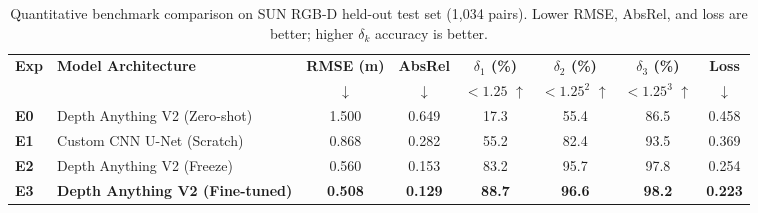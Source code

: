 \documentclass[twoside,final]{hcmut-report}
\renewcommand{\arraystretch}{1.12}
\begin{document}
\begin{table}[!htbp]

  \centering

  \caption{Quantitative benchmark comparison on SUN RGB-D held-out test set (1,034 pairs). Lower RMSE, AbsRel, and loss are better; higher $\delta_k$ accuracy is better.}

  \label{tab:benchmark_results}

  \small

  \setlength{\tabcolsep}{4pt}

  \renewcommand{\arraystretch}{1.12}

  \begin{adjustbox}{max width=\linewidth}
\begin{tabular}{@{}llcccccc@{}}

    \toprule

    \textbf{Exp}

    & \textbf{Model Architecture}

    & \textbf{RMSE (m)}

    & \textbf{AbsRel}

    & \textbf{$\delta_1$ (\%)}

    & \textbf{$\delta_2$ (\%)}

    & \textbf{$\delta_3$ (\%)}

    & \textbf{Loss} \\

    &

    & $\downarrow$

    & $\downarrow$

    & {\scriptsize $<1.25$ $\uparrow$}

    & {\scriptsize $<1.25^2$ $\uparrow$}

    & {\scriptsize $<1.25^3$ $\uparrow$}

    & $\downarrow$ \\

    \midrule

    \textbf{E0} & Depth Anything V2 (Zero-shot) & 1.500 & 0.649 & 17.3 & 55.4 & 86.5 & 0.458 \\

    \textbf{E1} & Custom CNN U-Net (Scratch)    & 0.868 & 0.282 & 55.2 & 82.4 & 93.5 & 0.369 \\

    \textbf{E2} & Depth Anything V2 (Freeze)    & 0.560 & 0.153 & 83.2 & 95.7 & 97.8 & 0.254 \\

    \textbf{E3} & \textbf{Depth Anything V2 (Fine-tuned)} & \textbf{0.508} & \textbf{0.129} & \textbf{88.7} & \textbf{96.6} & \textbf{98.2} & \textbf{0.223} \\


\end{tabular}
\end{adjustbox}
\end{table}
\end{document}
